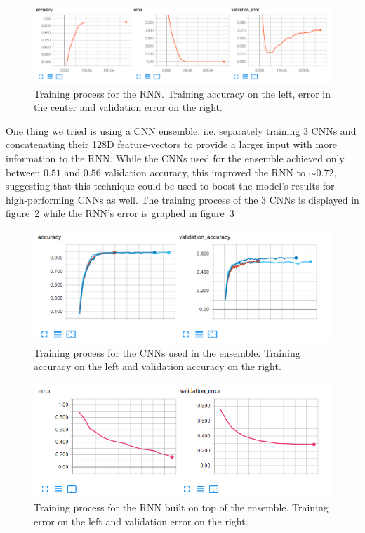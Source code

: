 \documentclass{utue} %
\begin{document}
\begin{figure}[h!]
	\centering
	\includegraphics[width=\columnwidth]{graphics/rnn_accuracy.png}
	\caption{\label{fig:rnn_accuracy} Training process for the RNN. Training accuracy on the left, error in the center and validation error on the right.}
\end{figure} 
One thing we tried is using a CNN ensemble, i.e. separately training 3 CNNs and concatenating their 128D feature-vectors to provide a larger input with more information to the RNN. While the CNNs used for the ensemble achieved only between $0.51$ and $0.56$ validation accuracy, this improved the RNN to $\sim 0.72$, suggesting that this technique could be used to boost the model's results for high-performing CNNs as well. The training process of the 3 CNNs is displayed in figure~\ref{fig:cnn_ensemble} while the RNN's error is graphed in figure~\ref{fig:rnn_ensemble}

\begin{figure}[h!]
	\centering
	\includegraphics[width=\columnwidth]{graphics/cnn_ensemble_accuracy.png}
	\caption{\label{fig:cnn_ensemble} Training process for the CNNs used in the ensemble. Training accuracy on the left and validation accuracy on the right.}
\end{figure} 
\begin{figure}[h!]
	\centering
	\includegraphics[width=\columnwidth]{graphics/rnn_ensemble_accuracy.png}
	\caption{\label{fig:rnn_ensemble} Training process for the RNN built on top of the ensemble. Training error on the left and validation error on the right.}
\end{figure} 
\end{document}
